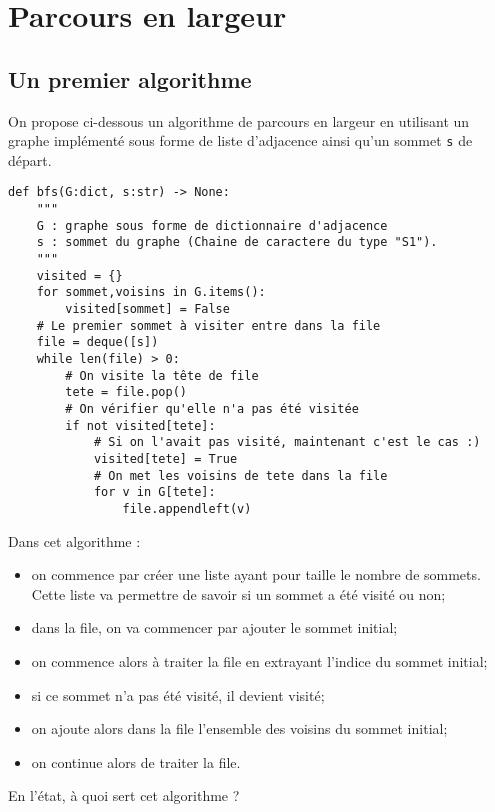 \section{Parcours en largeur}

\subsection{Un premier algorithme}
On propose ci-dessous un algorithme de parcours en largeur en utilisant un graphe implémenté sous forme de liste d'adjacence ainsi qu'un sommet \texttt{s} de départ. 

\begin{lstlisting}
def bfs(G:dict, s:str) -> None:
    """
    G : graphe sous forme de dictionnaire d'adjacence
    s : sommet du graphe (Chaine de caractere du type "S1").
    """
    visited = {}
    for sommet,voisins in G.items():
        visited[sommet] = False
    # Le premier sommet à visiter entre dans la file
    file = deque([s])
    while len(file) > 0:
        # On visite la tête de file
        tete = file.pop()
        # On vérifier qu'elle n'a pas été visitée
        if not visited[tete]:
            # Si on l'avait pas visité, maintenant c'est le cas :)
            visited[tete] = True            
            # On met les voisins de tete dans la file
            for v in G[tete]:
                file.appendleft(v)
\end{lstlisting}

Dans cet algorithme : 
\begin{itemize}
\item on commence par créer une liste ayant pour taille le nombre de sommets. Cette liste va permettre de savoir si un sommet a été visité ou non;
\item dans la file, on va commencer par ajouter le sommet initial;
\item on commence alors à traiter la file en extrayant l'indice du sommet initial;
\item si ce sommet n'a pas été visité, il devient visité;
\item on ajoute alors dans la file l'ensemble des voisins du sommet initial;
\item on continue alors de traiter la file. 
\end{itemize}

\begin{rem}
En l'état, à quoi sert cet algorithme ?
\end{rem}


